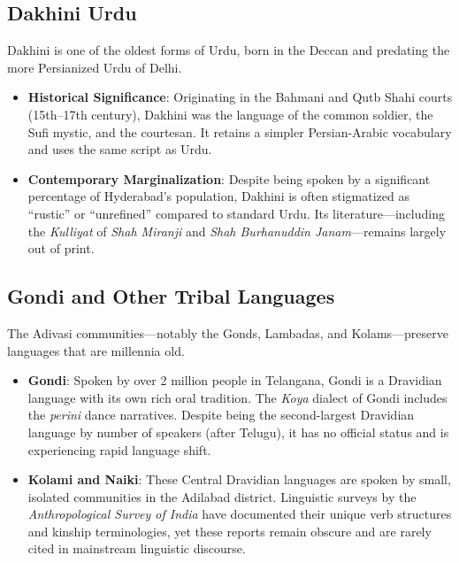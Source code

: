\documentclass[12pt]{article}
\begin{document}
\subsection{Dakhini Urdu}
Dakhini is one of the oldest forms of Urdu, born in the Deccan and predating the more Persianized Urdu of Delhi.
\begin{itemize}
    \item \textbf{Historical Significance}: Originating in the Bahmani and Qutb Shahi courts (15th–17th century), Dakhini was the language of the common soldier, the Sufi mystic, and the courtesan. It retains a simpler Persian-Arabic vocabulary and uses the same script as Urdu.
    \item \textbf{Contemporary Marginalization}: Despite being spoken by a significant percentage of Hyderabad’s population, Dakhini is often stigmatized as “rustic” or “unrefined” compared to standard Urdu. Its literature—including the \textit{Kulliyat} of \textit{Shah Miranji} and \textit{Shah Burhanuddin Janam}—remains largely out of print. \cite{dakhini}
\end{itemize}

\subsection{Gondi and Other Tribal Languages}
The Adivasi communities—notably the Gonds, Lambadas, and Kolams—preserve languages that are millennia old.
\begin{itemize}
    \item \textbf{Gondi}: Spoken by over 2 million people in Telangana, Gondi is a Dravidian language with its own rich oral tradition. The \textit{Koya} dialect of Gondi includes the \textit{perini} dance narratives. Despite being the second-largest Dravidian language by number of speakers (after Telugu), it has no official status and is experiencing rapid language shift.
    \item \textbf{Kolami and Naiki}: These Central Dravidian languages are spoken by small, isolated communities in the Adilabad district. Linguistic surveys by the \textit{Anthropological Survey of India} have documented their unique verb structures and kinship terminologies, yet these reports remain obscure and are rarely cited in mainstream linguistic discourse. \cite{kolami}
\end{itemize}
\end{document}

